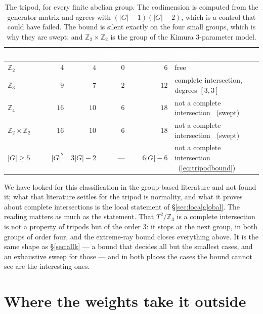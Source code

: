 \documentclass[11pt,a4paper]{article}
\theoremstyle{definition}
\newcommand{\ZZ}{\mathbb{Z}}
\begin{document}
\begin{table}[h]
\centering\small
\begin{tabular}{lrrrrl}
\toprule
\rowcolor{hdrblue}
\textcolor{white}{$G$} & \textcolor{white}{$n=|G|^2$} & \textcolor{white}{$\dim S$} &
\textcolor{white}{codim} & \textcolor{white}{$2\dim S-2$} & \textcolor{white}{verdict}\\
\midrule
$\ZZ_2$ & $4$ & $4$ & $0$ & $6$ & free\\
\rowcolor{softgrey}
$\ZZ_3$ & $9$ & $7$ & $2$ & $12$ & complete intersection, degrees $[3,3]$\\
$\ZZ_4$ & $16$ & $10$ & $6$ & $18$ & not a complete intersection \ (swept)\\
\rowcolor{softgrey}
$\ZZ_2\times\ZZ_2$ & $16$ & $10$ & $6$ & $18$ & not a complete intersection \ (swept)\\
$|G|\ge5$ & $|G|^2$ & $3|G|-2$ & --- & $6|G|-6$ & not a complete intersection \
(\eqref{eq:tripodbound})\\
\bottomrule
\end{tabular}
\caption{The tripod, for every finite abelian group. The codimension is computed from the generator
matrix and agrees with $(|G|-1)(|G|-2)$, which is a control that could have failed. The bound is
silent exactly on the four small groups, which is why they are swept; and $\ZZ_2\times\ZZ_2$ is the
group of the Kimura 3-parameter model.}
\label{tab:tripod}
\end{table}

\noindent
We have looked for this classification in the group-based literature and not found it; what that
literature settles for the tripod is normality, and what it proves about complete intersections is
the local statement of \S\ref{sec:localglobal}. The reading matters as much as the statement. That
$T^2/\ZZ_3$ is a complete intersection is not a
property of tripods but of the order $3$: it stops at the next group, in both groups of order four,
and the extreme-ray bound closes everything above. It is the same shape as
\S\ref{sec:allk} --- a bound that decides all but the smallest cases, and an exhaustive sweep for
those --- and in both places the cases the bound cannot see are the interesting ones.

\section{Where the weights take it outside}\label{sec:weights}
\end{document}
